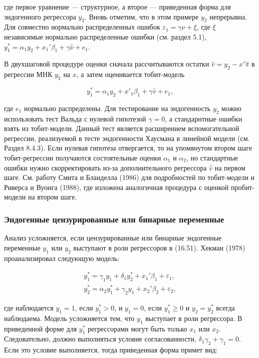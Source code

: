 где первое уравнение ---  структурное, а второе --- приведенная форма для эндогенного регрессора $y_2$. Вновь отметим, что в этом примере $y_2$ непрерывна. Для совместно нормально распределенных ошибок $\varepsilon_1=\gamma\nu+\xi$, где $\xi$ независимые нормально распределенные ошибки (см. раздел 5.1),  $y_1^{*}=\alpha_1{y_2}+x_1'\beta_1+\gamma\hat{\nu}+e_1$.

В двухшаговой процедуре оценки сначала рассчитываются остатки  $\hat{v}=y_2-x'\hat{\pi}$ 
в регрессии МНК $y_2$ на $x$, а затем оценивается тобит-модель

\[
y_1^*=\alpha_1 y_2 + x'_1\beta_1+\gamma \hat{v}+e_1,
\]



где $e_1$ нормально распределены. Для тестирование на эндогенность $y_2$ можно использовать тест Вальда с нулевой гипотезой $\gamma=0$, а стандарнтные ошибки взять из тобит-модели. Данный тест является расширением вспомогательной регрессии, реализуемой в тесте эндогенности Хаусмана в линейной модели (см. Раздел 8.4.3). Если нулевая гипотеза отвергается, то на упомянутом втором шаге тобит-регрессии получаются состоятельные оценки $\alpha_1$ и $\alpha_2$, но стандартные ошибки нужно скорректировать из-за дополнительного регрессора $\hat{v}$ на первом шаге. См. работу Смита и Бланделла (1986) для подробностей по тобит-модели и Риверса и Вуонга (1988), где изложена аналогичная процедура с оценкой пробит-модели на втором шаге.


\subsubsection*{Эндогенные цензурированные или бинарные переменные}

Анализ усложняется, если цензурированные или бинарные эндогенные переменные $y_1$ или $y_2$ выступают в роли регрессоров в (16.51). Хекман (1978) проанализировал следующую модель:

\begin{equation}
\begin{array}{l}
y_1^{*}=\gamma_1{y_1}+\delta_1{y_2^{*}}+x_1'\beta_1+\varepsilon_1, \\
y_2^{*}=\alpha_2{y_1^{*}}+\gamma_2{y_1}+x_2'\beta_2+\varepsilon_2,
\end{array}
\end{equation}

где наблюдается $y_1=1$, если $y_1^{*}>0$, и $y_1=0$, если $y_1^{*}{\geq}0$ и $y_2=y_2^{*}$ всегда наблюдаема. Модель усложняется тем, что $y_1$ выступает в роли регрессора. В приведенной форме для $y_1^{*}$ регрессорами могут быть только $x_1$ или $x_2$. Следовательно, должно выполняться условие согласованности, $\delta_1\gamma_2+\gamma_1=0$. Если это условие выполняется, тогда приведенная форма примет вид:

